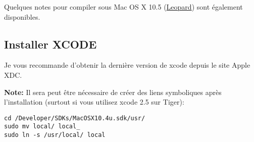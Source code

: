 Quelques notes pour compiler sous Mac OS X 10.5 (\underline{Leopard}) sont également disponibles.

% 
% 

\subsection{Installer XCODE}
Je vous recommande d'obtenir la dernière version de xcode depuis le site Apple XDC.

\textbf{Note:} Il sera peut être nécessaire de créer des liens symboliques après l'installation (surtout si vous utilisez xcode 2.5 sur Tiger):

\begin{verbatim}
cd /Developer/SDKs/MacOSX10.4u.sdk/usr/
sudo mv local/ local_
sudo ln -s /usr/local/ local
\end{verbatim}

% 
% 
% 
% 

